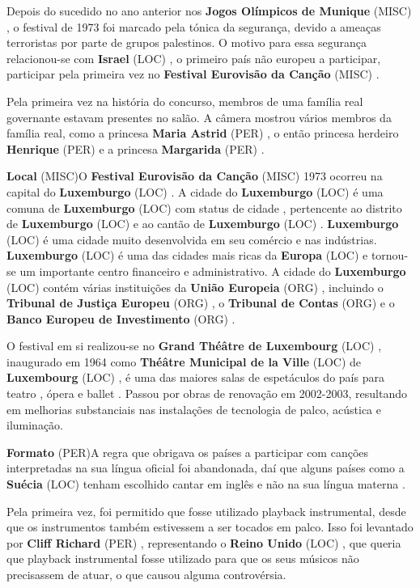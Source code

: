 \documentclass[12pt,a4paper]{article}
\begin{document}
Depois do sucedido no ano anterior nos \textbf{Jogos Olímpicos de Munique} (MISC) , o festival de 1973 foi marcado pela tónica da segurança, devido a ameaças terroristas por parte de grupos palestinos. O motivo para essa segurança relacionou-se com \textbf{Israel} (LOC) , o primeiro país não europeu a participar, participar pela primeira vez no \textbf{Festival Eurovisão da Canção} (MISC) .

Pela primeira vez na história do concurso, membros de uma família real governante estavam presentes no salão. A câmera mostrou vários membros da família real, como a princesa \textbf{Maria Astrid} (PER) , o então princesa herdeiro \textbf{Henrique} (PER) e a princesa \textbf{Margarida} (PER) .



\textbf{Local} (MISC)O \textbf{Festival Eurovisão da Canção} (MISC) 1973 ocorreu na capital do \textbf{Luxemburgo} (LOC) . A cidade do \textbf{Luxemburgo} (LOC) é uma comuna de \textbf{Luxemburgo} (LOC) com status de cidade , pertencente ao distrito de \textbf{Luxemburgo} (LOC) e ao cantão de \textbf{Luxemburgo} (LOC) . \textbf{Luxemburgo} (LOC) é uma cidade muito desenvolvida em seu comércio e nas indústrias. \textbf{Luxemburgo} (LOC) é uma das cidades mais ricas da \textbf{Europa} (LOC) e tornou-se um importante centro financeiro e administrativo. A cidade do \textbf{Luxemburgo} (LOC) contém várias instituições da \textbf{União Europeia} (ORG) , incluindo o \textbf{Tribunal de Justiça Europeu} (ORG) , o \textbf{Tribunal de Contas} (ORG) e o \textbf{Banco Europeu de Investimento} (ORG) .

O festival em si realizou-se no \textbf{Grand Théâtre de Luxembourg} (LOC) , inaugurado em 1964 como \textbf{Théâtre Municipal de la Ville} (LOC) de \textbf{Luxembourg} (LOC) , é uma das maiores salas de espetáculos do país para teatro , ópera e ballet . Passou por obras de renovação em 2002-2003, resultando em melhorias substanciais nas instalações de tecnologia de palco, acústica e iluminação.



\textbf{Formato} (PER)A regra que obrigava os países a participar com canções interpretadas na sua língua oficial foi abandonada, daí que alguns países como a \textbf{Suécia} (LOC) tenham escolhido cantar em inglês e não na sua língua materna .

Pela primeira vez, foi permitido que fosse utilizado playback instrumental, desde que os instrumentos também estivessem a ser tocados em palco. Isso foi levantado por \textbf{Cliff Richard} (PER) , representando o \textbf{Reino Unido} (LOC) , que queria que playback instrumental fosse utilizado para que os seus músicos não precisassem de atuar, o que causou alguma controvérsia.
\end{document}

